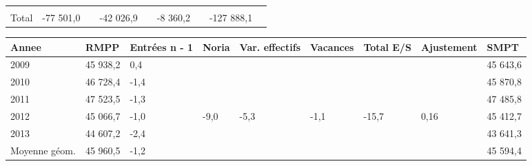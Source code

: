\begin{longtable}[]{@{}lllllllll@{}}
\begin{minipage}[t]{0.06\columnwidth}
\strut
\end{minipage} & \begin{minipage}[t]{0.12\columnwidth}\raggedright
\strut
\end{minipage} & \begin{minipage}[t]{0.06\columnwidth}\raggedright
\strut
\end{minipage} & \begin{minipage}[t]{0.09\columnwidth}\raggedright
\strut
\end{minipage} & \begin{minipage}[t]{0.06\columnwidth}\raggedright
\strut
\end{minipage}\tabularnewline
\begin{minipage}[t]{0.05\columnwidth}\raggedright
Total\strut
\end{minipage} & \begin{minipage}[t]{0.10\columnwidth}\raggedright
-77 501,0\strut
\end{minipage} & \begin{minipage}[t]{0.06\columnwidth}\raggedright
\strut
\end{minipage} & \begin{minipage}[t]{0.16\columnwidth}\raggedright
-42 026,9\strut
\end{minipage} & \begin{minipage}[t]{0.06\columnwidth}\raggedright
\strut
\end{minipage} & \begin{minipage}[t]{0.12\columnwidth}\raggedright
-8 360,2\strut
\end{minipage} & \begin{minipage}[t]{0.06\columnwidth}\raggedright
\strut
\end{minipage} & \begin{minipage}[t]{0.09\columnwidth}\raggedright
-127 888,1\strut
\end{minipage} & \begin{minipage}[t]{0.06\columnwidth}\raggedright
\strut
\end{minipage}\tabularnewline
\bottomrule
\end{longtable}

\begin{longtable}[]{@{}lllllllll@{}}
\toprule
Annee & RMPP & Entrées n - 1 & Noria & Var. effectifs & Vacances & Total
E/S & Ajustement & SMPT\tabularnewline
\midrule
\endhead
2009 & 45 938,2 & 0,4 & & & & & & 45 643,6\tabularnewline
2010 & 46 728,4 & -1,4 & & & & & & 45 870,8\tabularnewline
2011 & 47 523,5 & -1,3 & & & & & & 47 485,8\tabularnewline
2012 & 45 066,7 & -1,0 & -9,0 & -5,3 & -1,1 & -15,7 & 0,16 & 45
412,7\tabularnewline
2013 & 44 607,2 & -2,4 & & & & & & 43 641,3\tabularnewline
Moyenne géom. & 45 960,5 & -1,2 & & & & & & 45 594,4\tabularnewline
\bottomrule
\end{longtable}

